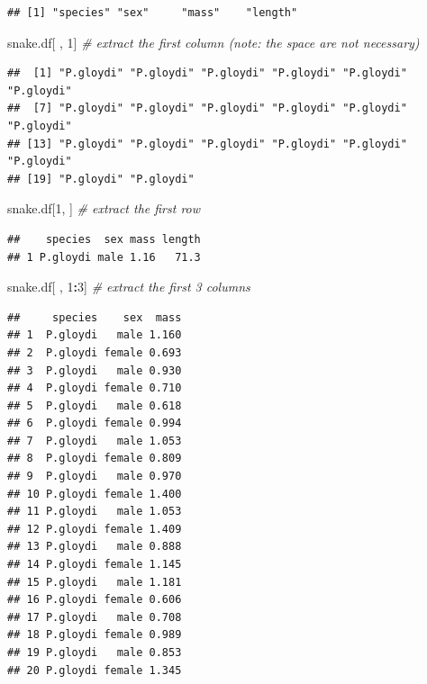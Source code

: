 \documentclass[
]{book}
\newenvironment{Shaded}{\begin{snugshade}}{\end{snugshade}}
\newcommand{\CommentTok}[1]{\textcolor[rgb]{0.56,0.35,0.01}{\textit{#1}}}
\newcommand{\DecValTok}[1]{\textcolor[rgb]{0.00,0.00,0.81}{#1}}
\newcommand{\NormalTok}[1]{#1}
\newcommand{\SpecialCharTok}[1]{\textcolor[rgb]{0.81,0.36,0.00}{\textbf{#1}}}
\begin{document}
\begin{verbatim}
## [1] "species" "sex"     "mass"    "length"
\end{verbatim}

\begin{Shaded}
\begin{Highlighting}[]
\NormalTok{snake.df[ , }\DecValTok{1}\NormalTok{]  }\CommentTok{\# extract the first column (note: the space are not necessary)}
\end{Highlighting}
\end{Shaded}

\begin{verbatim}
##  [1] "P.gloydi" "P.gloydi" "P.gloydi" "P.gloydi" "P.gloydi" "P.gloydi"
##  [7] "P.gloydi" "P.gloydi" "P.gloydi" "P.gloydi" "P.gloydi" "P.gloydi"
## [13] "P.gloydi" "P.gloydi" "P.gloydi" "P.gloydi" "P.gloydi" "P.gloydi"
## [19] "P.gloydi" "P.gloydi"
\end{verbatim}

\begin{Shaded}
\begin{Highlighting}[]
\NormalTok{snake.df[}\DecValTok{1}\NormalTok{, ]  }\CommentTok{\# extract the first row}
\end{Highlighting}
\end{Shaded}

\begin{verbatim}
##    species  sex mass length
## 1 P.gloydi male 1.16   71.3
\end{verbatim}

\begin{Shaded}
\begin{Highlighting}[]
\NormalTok{snake.df[ , }\DecValTok{1}\SpecialCharTok{:}\DecValTok{3}\NormalTok{]  }\CommentTok{\# extract the first 3 columns}
\end{Highlighting}
\end{Shaded}

\begin{verbatim}
##     species    sex  mass
## 1  P.gloydi   male 1.160
## 2  P.gloydi female 0.693
## 3  P.gloydi   male 0.930
## 4  P.gloydi female 0.710
## 5  P.gloydi   male 0.618
## 6  P.gloydi female 0.994
## 7  P.gloydi   male 1.053
## 8  P.gloydi female 0.809
## 9  P.gloydi   male 0.970
## 10 P.gloydi female 1.400
## 11 P.gloydi   male 1.053
## 12 P.gloydi female 1.409
## 13 P.gloydi   male 0.888
## 14 P.gloydi female 1.145
## 15 P.gloydi   male 1.181
## 16 P.gloydi female 0.606
## 17 P.gloydi   male 0.708
## 18 P.gloydi female 0.989
## 19 P.gloydi   male 0.853
## 20 P.gloydi female 1.345
\end{verbatim}
\end{document}
